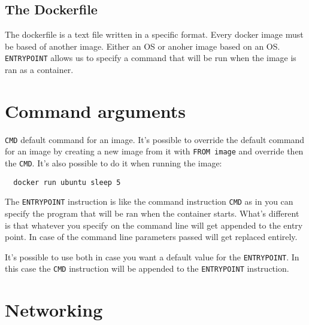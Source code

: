 \documentclass[french]{article}
\begin{document}
\subsection{The Dockerfile}

The dockerfile is a text file written in a specific format. Every docker image must be based of another image. Either an OS or anoher image based on an OS. \\
\verb|ENTRYPOINT| allows us to specify a command that will be run when the image is ran as a container.

\section{Command arguments}

\verb|CMD| default command for an image. It's possible to override the default command for an image by creating a new image from it with \verb|FROM image| and override then the \verb|CMD|.
It's also possible to do it when running the image:
\begin{verbatim}
  docker run ubuntu sleep 5
\end{verbatim}

The \verb|ENTRYPOINT| instruction is like the command instruction \verb|CMD| as in you can specify the program that will be ran when the container starts. What's different is that whatever you specify on the command line will get appended to the entry point. In case of the command line parameters passed will get replaced entirely.

It's possible to use both in case you want a default value for the \verb|ENTRYPOINT|. In this case the \verb|CMD| instruction will be appended to the \verb|ENTRYPOINT| instruction.

\section{Networking}
\end{document}
